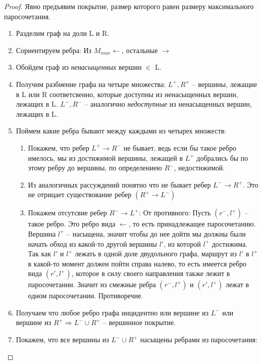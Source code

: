 \begin{proof} 
	Явно предъявим покрытие, размер которого равен размеру максимального паросочетания.\\
	\begin{enumerate}
		\item Разделим граф на доли L и R.
		\item Сориентируем ребра: Из $M_{max} \longleftarrow$, остальные $\longrightarrow$
		\item Обойдем граф из \textit{ненасыщенных} вершин $\in$ L.
		\item Получим разбиение графа на четыре множества: 
		$L^+, R^+$ -- вершины, лежащие в L или R соответсвенно, которые доступны из ненасыщенных вершин, лежащих в L. 
		$L^-, R ^-$ -- аналогично \textit{недоступные} из ненасыщенных вершин, лежащих в L. 
		\item Поймем какие ребра бывают между каждыми из четырех множеств:
		\begin{enumerate}
			\item Покажем, что ребер $L^+ \rightarrow R^-$ не бывает, ведь если бы такое ребро имелось, мы из достижимой вершины, лежащей в $L^+$ добрались бы по этому ребру до вершины, по определениею $R^-$, недостижимой. 
			\item Из аналогичных рассуждений понятно что не бывает ребер $L^- \rightarrow R^+$. Это не отрицает существование ребер $(R^+ \rightarrow L^-)$
			\item Покажем отсутсвие ребер $R^- \rightarrow L^+$:
		От противного: Пусть  $(r^-, l^+)$ -- такое ребро. Это ребро вида  $\longleftarrow$, то есть принадлежащее паросочетанию.\\
		Вершина $l^+$ -- насыщена, значит чтобы до нее дойти мы должны были начать обход из какой-то другой вершины  $l'$, из которой $l^+$ достижима.\\
		Так как  $l'$ и $l^+$ лежать в одной доле двудольного графа, маршрут из $l'$ в $l^+$ в какой-то момент должен пойти справа налево, то есть имеется ребро вида $(r', l^+)$, которое в силу своего направления также лежит в паросочетании. Значит из смежные ребра  $(r^-, l^+)$ и  $(r', l^+)$ лежат в одном паросочетании. Противоречие.\\
		\end{enumerate}
		\item Получаем что любое ребро графа инцидентно или вершине из $L^-$ или вершине из $R^+ \Rightarrow L^- \cup R^+$ -- вершинное покрытие.
		\item Покажем, что все вершины из $L^- \cup R^+$ насыщены ребрами из паросочетания:\\

\end{enumerate}
\end{proof}

